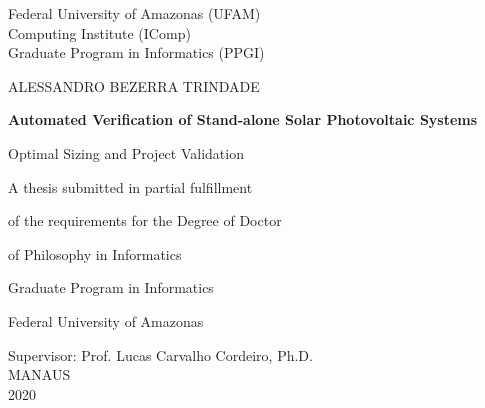 \begin{titlepage}
    \begin{center}
        \Large
        Federal University of Amazonas (UFAM)\\
        Computing Institute (IComp)\\
		Graduate Program in Informatics (PPGI)\\

        \vspace*{1cm}
        
		\Large
		ALESSANDRO BEZERRA TRINDADE

        \vspace*{2cm}
        		        
        \Huge
        \textbf{Automated Verification of Stand-alone Solar Photovoltaic Systems}
        
        \vspace{0.5cm}
        \LARGE
        Optimal Sizing and Project Validation
        
        \vspace{2cm}
    \end{center}        
    

\hspace{6cm}        A thesis  submitted  in  partial fulfillment

\hspace{6cm}        of the requirements for the Degree of Doctor

\hspace{6cm}        of Philosophy in Informatics

\hspace{6cm}        Graduate Program in Informatics 

\hspace{6cm}        Federal University of Amazonas
        
        \vspace{2cm}
        
        \begin{center}
        Supervisor: Prof. Lucas Carvalho Cordeiro, Ph.D.\\
        \vspace{1cm}
        MANAUS\\
        2020\\
        \end{center}
\end{titlepage}
